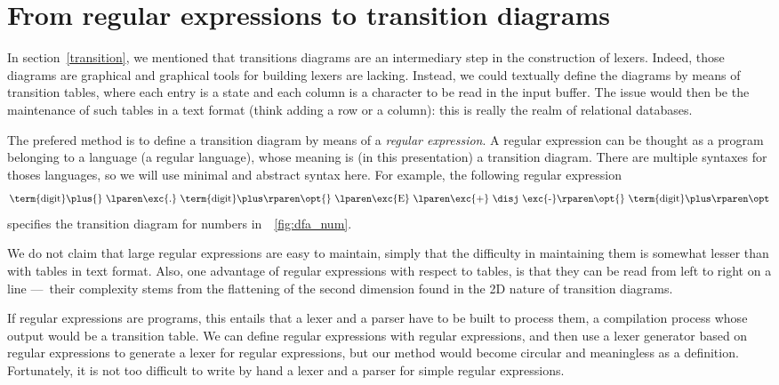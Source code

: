 \section{From regular expressions to transition diagrams}

In section~\vref{transition}, we mentioned that transitions diagrams
are an intermediary step in the construction of lexers. Indeed, those
diagrams are graphical and graphical tools for building lexers are
lacking. Instead, we could textually define the diagrams by means of
transition tables, where each entry is a state and each column is a
character to be read in the input buffer. The issue would then be the
maintenance of such tables in a text format (think adding a row or a
column): this is really the realm of relational databases.

The prefered method is to define a transition diagram by means of a
\emph{regular expression}. A regular expression can be thought as a
program belonging to a language (a regular language), whose meaning is
(in this presentation) a transition diagram. There are multiple
syntaxes for thoses languages, so we will use minimal and abstract
syntax here. For example, the following regular expression
\begin{align*}
\text{\term{digit}\plus{} \lparen\exc{.}
  \term{digit}\plus\rparen\opt{} \lparen\exc{E} \lparen\exc{+} \disj
  \exc{-}\rparen\opt{} \term{digit}\plus\rparen\opt}
\end{align*}
specifies the transition diagram for numbers
in~\fig~\vref{fig:dfa_num}.

We do not claim that large regular expressions are easy to maintain,
simply that the difficulty in maintaining them is somewhat lesser than
with tables in text format. Also, one advantage of regular expressions
with respect to tables, is that they can be read from left to right on
a line ---~their complexity stems from the flattening of the second
dimension found in the 2D nature of transition diagrams.

If regular expressions are programs, this entails that a lexer and a
parser have to be built to process them, a compilation process whose
output would be a transition table. We can define regular expressions
with regular expressions, and then use a lexer generator based on
regular expressions to generate a lexer for regular expressions, but
our method would become circular and meaningless as a
definition. Fortunately, it is not too difficult to write by hand a
lexer and a parser for simple regular expressions.

